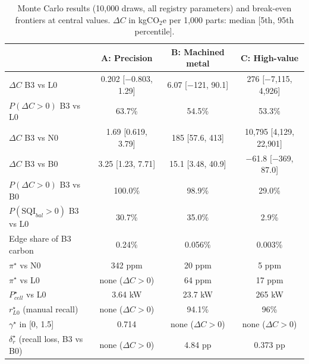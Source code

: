 \begin{table}[!t]
\centering
\footnotesize
\caption{Monte Carlo results (10{,}000 draws, all registry parameters) and break-even frontiers at central values. $\Delta C$ in kgCO$_2$e per 1{,}000 parts: median [5th, 95th percentile].}
\label{tab:uncertainty}
\setlength{\tabcolsep}{8pt}
\begin{tabular}{@{}lccc@{}}
\toprule
 & A: Precision & B: Machined metal & C: High-value \\
\midrule
$\Delta C$ B3 vs L0 & 0.202 [$-$0.803, 1.29] & 6.07 [$-$121, 90.1] & 276 [$-$7{,}115, 4{,}926] \\
$P(\Delta C>0)$ B3 vs L0 & 63.7\% & 54.5\% & 53.3\% \\
$\Delta C$ B3 vs N0 & 1.69 [0.619, 3.79] & 185 [57.6, 413] & 10{,}795 [4{,}129, 22{,}901] \\
$\Delta C$ B3 vs B0 & 3.25 [1.23, 7.71] & 15.1 [3.48, 40.9] & $-$61.8 [$-$369, 87.0] \\
$P(\Delta C>0)$ B3 vs B0 & 100.0\% & 98.9\% & 29.0\% \\
$P(\mathrm{SQI}_{bal}>0)$ B3 vs L0 & 30.7\% & 35.0\% & 2.9\% \\
Edge share of B3 carbon & 0.24\% & 0.056\% & 0.003\% \\
\midrule
$\pi^\star$ vs N0 & 342 ppm & 20 ppm & 5 ppm \\
$\pi^\star$ vs L0 & none ($\Delta C>0$) & 64 ppm & 17 ppm \\
$P^\star_{cell}$ vs L0 & 3.64 kW & 23.7 kW & 265 kW \\
$r^\star_{L0}$ (manual recall) & none ($\Delta C>0$) & 94.1\% & 96\% \\
$\gamma^\star$ in [0, 1.5] & 0.714 & none ($\Delta C>0$) & none ($\Delta C>0$) \\
$\delta_r^\star$ (recall loss, B3 vs B0) & none ($\Delta C>0$) & 4.84 pp & 0.373 pp \\
\bottomrule
\end{tabular}
\end{table}
